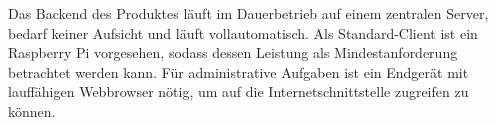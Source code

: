 Das Backend des Produktes läuft im Dauerbetrieb auf einem zentralen Server, bedarf keiner Aufsicht und läuft vollautomatisch. Als Standard-Client ist ein Raspberry Pi vorgesehen, sodass dessen Leistung als Mindestanforderung betrachtet werden kann. Für administrative Aufgaben ist ein Endgerät mit lauffähigen Webbrowser nötig, um auf die Internetschnittstelle zugreifen zu können.

